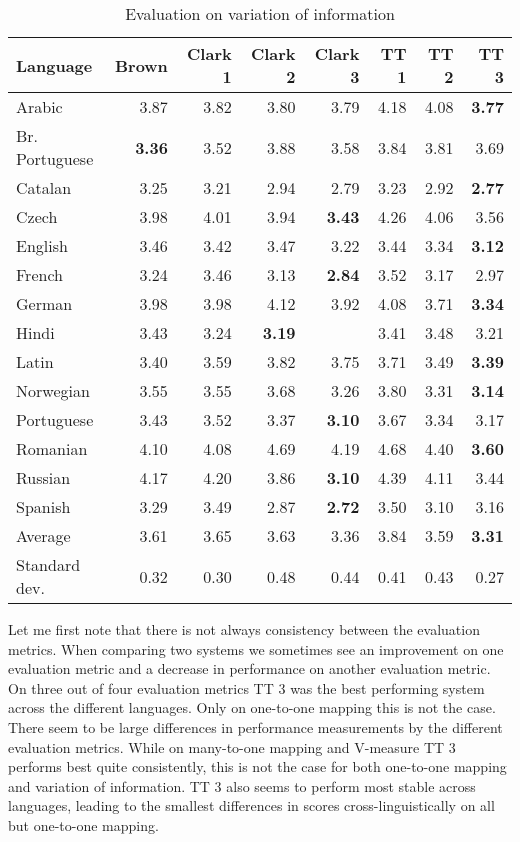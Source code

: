 \documentclass[11pt]{article}
\begin{document}
{\begin{table}
\scriptsize
\centering
\begin{tabular}{l|r|r|r|r|r|r|r}
\bf Language & \bf Brown & \bf \bf Clark 1 & \bf Clark 2 & \bf Clark 3 & \bf TT 1 & \bf TT 2 & \bf TT 3\\
\hline
Arabic & 3.87 & 3.82 & 3.80 & 3.79 & 4.18 & 4.08 & \bf 3.77\\
Br. Portuguese & \bf 3.36 & 3.52 & 3.88 & 3.58 & 3.84 & 3.81 & 3.69\\
Catalan & 3.25 & 3.21 & 2.94 & 2.79 & 3.23 & 2.92 & \bf 2.77\\
Czech & 3.98 & 4.01 & 3.94 & \bf 3.43 & 4.26 & 4.06 & 3.56\\
English & 3.46 & 3.42 & 3.47 & 3.22 & 3.44 & 3.34 & \bf 3.12\\
French & 3.24 & 3.46 & 3.13 & \bf 2.84 & 3.52 & 3.17 & 2.97\\
German & 3.98 & 3.98 & 4.12 & 3.92 & 4.08 & 3.71 & \bf 3.34\\
Hindi & 3.43 & 3.24 & \bf 3.19 &  & 3.41 & 3.48 & 3.21\\
Latin & 3.40 & 3.59 & 3.82 & 3.75 & 3.71 & 3.49 & \bf 3.39\\
Norwegian & 3.55 & 3.55 & 3.68 & 3.26 & 3.80 & 3.31 & \bf 3.14\\
Portuguese & 3.43 & 3.52 & 3.37 & \bf 3.10 & 3.67 & 3.34 & 3.17\\
Romanian & 4.10 & 4.08 & 4.69 & 4.19 & 4.68 & 4.40 & \bf 3.60\\
Russian & 4.17 & 4.20 & 3.86 & \bf 3.10 & 4.39 & 4.11 & 3.44\\
Spanish & 3.29 & 3.49 & 2.87 & \bf 2.72 & 3.50 & 3.10 & 3.16\\
\hline
Average & 3.61 & 3.65 & 3.63 & 3.36 & 3.84 & 3.59 & \bf 3.31\\
Standard dev. & 0.32 & 0.30 & 0.48 & 0.44 & 0.41 & 0.43 & 0.27\\

\end{tabular}
\caption{Evaluation on variation of information}\label{varinfo}
\end{table}
Let me first note that there is not always consistency between the evaluation metrics. When comparing two systems we sometimes see an improvement on one evaluation metric and a decrease in performance on another evaluation metric. On three out of four evaluation metrics TT 3 was the best performing system across the different languages. Only on one-to-one mapping this is not the case. There seem to be large differences in performance measurements by the different evaluation metrics. While on many-to-one mapping and V-measure TT 3 performs best quite consistently, this is not the case for both one-to-one mapping and variation of information. TT 3 also seems to perform most stable across languages, leading to the smallest differences in scores cross-linguistically on all but one-to-one mapping.

}
\end{document}
